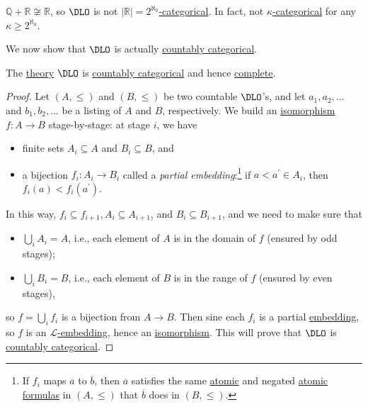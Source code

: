\begin{eg}
	\(\mathbb{Q} + \mathbb{R} \not \cong \mathbb{R} \), so \(\DLO\) is not \hyperref[def:categorical]{\(\vert \mathbb{R} \vert = 2^{\aleph_0}\)-categorical}. In fact, not \hyperref[def:categorical]{\(\kappa \)-categorical} for any \(\kappa \geq 2^{\aleph_0}\).
\end{eg}

We now show that \(\DLO\) is actually \hyperref[def:countably-categorical]{countably categorical}.

\begin{theorem}\label{thm:DLO-countably-categorical}
	The \hyperref[def:theory]{theory} \(\DLO\) is \hyperref[def:countably-categorical]{countably categorical} and hence \hyperref[def:theory-complete]{complete}.
\end{theorem}
\begin{proof}
	Let \((A, \leq )\) and \((B, \leq )\) be two countable \(\DLO\)'s, and let \(a_1, a_2, \ldots \) and \(b_1, b_2, \ldots \) be a listing of \(A\) and \(B\), respectively. We build an \hyperref[def:isomorphism]{isomorphism} \(f\colon A \to B\) stage-by-stage: at stage \(i\), we have
	\begin{itemize}
		\item finite sets \(A_i \subseteq A\) and \(B_i \subseteq B\), and
		\item a bijection \(f_i \colon A_i \to B_i\) called a \emph{partial embedding}:\footnote{If \(f_i\) maps \(\overline{a} \) to \(\overline{b} \), then \(\overline{a} \) satisfies the same \hyperref[not:atomic]{atomic} and negated \hyperref[not:atomic]{atomic} \hyperref[def:formula]{formulas} in \((A, \leq )\) that \(\overline{b} \) does in \((B, \leq )\).} if \(a < a^\prime \in A_i\), then \(f_i(a) < f_i(a^\prime )\).
	\end{itemize}
	In this way, \(f_i \subseteq f_{i+1} , A_i \subseteq A_{i+1} \), and \(B_i \subseteq B_{i+1} \), and we need to make sure that
	\begin{itemize}
		\item \(\bigcup_{i} A_i = A\), i.e., each element of \(A\) is in the domain of \(f\) (ensured by odd stages);
		\item \(\bigcup_{i} B_i = B\), i.e., each element of \(B\) is in the range of \(f\) (ensured by even stages),
	\end{itemize}
	so \(f = \bigcup_{i} f_i\) is a bijection from \(A \to B\). Then sine each \(f_i\) is a partial \hyperref[def:embedding]{embedding}, so \(f\) is an \hyperref[def:embedding]{\(\mathcal{L} \)-embedding}, hence an \hyperref[def:isomorphism]{isomorphism}. This will prove that \(\DLO\) is \hyperref[def:countably-categorical]{countably categorical}.


\end{proof}

